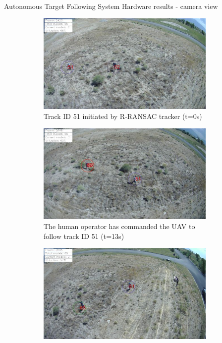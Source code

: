 \documentclass[9pt]{beamer}
\begin{document}
\begin{frame}{Autonomous Target Following System}
Hardware results - camera view
\begin{figure}[htbp]
	\begin{subfigure}{0.3\linewidth}
		\centering
		\includegraphics[width=0.95\textwidth]{chapter3/ID51_track_begin.png}
		\caption{Track ID 51 initiated by R-RANSAC tracker (t=0s)}
		\label{camera1}
	\end{subfigure}
	\begin{subfigure}{0.3\linewidth}
		\centering
		\includegraphics[width=0.95\textwidth]{chapter3/ID51_follow_begin.png}
		\caption{The human operator has commanded the UAV to follow track ID 51 (t=13s)}
		\label{camera2}
	\end{subfigure}
	\begin{subfigure}{0.3\linewidth}
		\centering
		\includegraphics[width=0.95\textwidth]{chapter3/ID65_track_begin.png}

\end{subfigure}
\end{figure}
\end{frame}
\end{document}
